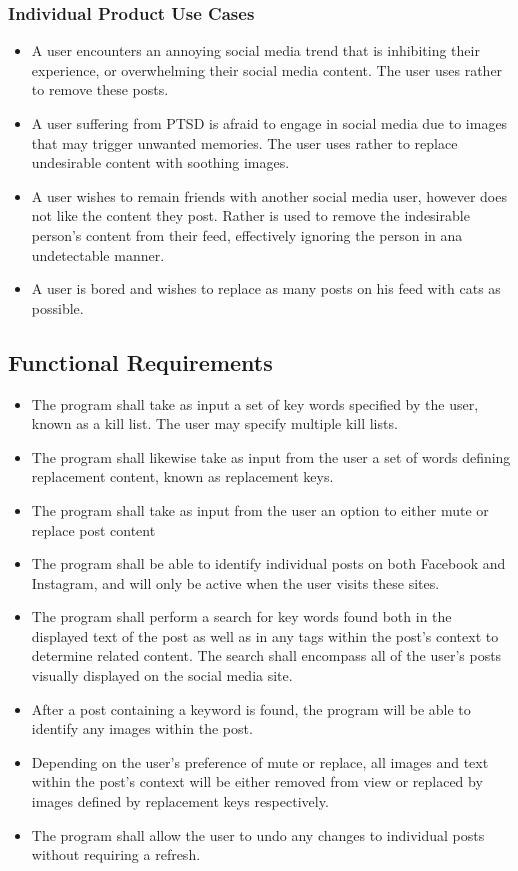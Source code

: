 \documentclass[12pt, titlepage]{article}
\begin{document}
\subsubsection{Individual Product Use Cases}
\begin{itemize}
  \item A user encounters an annoying social media trend that is inhibiting their experience, or overwhelming their social media content. The user uses rather to remove these posts.
  \item A user suffering from PTSD is afraid to engage in social media due to images that may trigger unwanted memories. The user uses rather to replace undesirable content with soothing images.
  \item A user wishes to remain friends with another social media user, however does not like the content they post. Rather is used to remove the indesirable person's content from their feed, effectively ignoring the person in ana %
   undetectable manner.
  \item A user is bored and wishes to replace as many posts on his feed with cats as possible.
  
\end{itemize}

\subsection{Functional Requirements}
\begin{itemize}
  \item The program shall take as input a set of key words specified by the user, known as a kill list. The user may specify multiple kill lists.
  \item The program shall likewise take as input from the user a set of words defining replacement content, known as replacement keys.
  \item The program shall take as input from the user an option to either mute or replace post content
  \item The program shall be able to identify individual posts on both Facebook and Instagram, and will only be active when the user visits these sites.
  \item The program shall perform a search for key words found both in the displayed text of the post as well as in any tags within the post's context to determine related content. The search shall encompass all of the user's posts visually displayed on the social media site.
  \item After a post containing a keyword is found, the program will be able to identify any images within the post.
  \item Depending on the user's preference of mute or replace, all images and text within the post's context will be either removed from view or replaced by images defined by replacement keys respectively.
  \item The program shall allow the user to undo any changes to individual posts without requiring a refresh.
\end{itemize}
\end{document}

